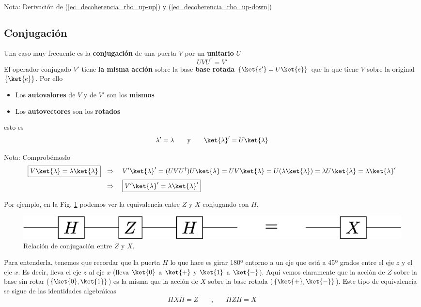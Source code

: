 \documentclass[a4paper,11pt]{book} %
\numberwithin{equation}{chapter}
\def\lch{\left\{}
\def\rch{\right\}}
\begin{document}
\begin{mybox_blue}{Nota: Derivación de (\ref{ec_decoherencia_rho_up-up}) y  (\ref{ec_decoherencia_rho_up-down})}
        \subsection{Conjugación}

Una caso muy frecuente es la \textbf{conjugación} de una puerta $V$  por un \textbf{unitario} $U$
	\begin{equation}
	U V   U^\dagger = V'  
	\end{equation}
El operador conjugado $V'$ tiene \textbf{la misma acción} sobre la base \textbf{base rotada} $\{\ket{e'} = U\ket{e}\}$ que la que tiene $V$ sobre la original $\{\ket{e}\}$. Por ello
\begin{itemize}
	\item Los \textbf{autovalores} de $V$ y de $V'$ son los \textbf{mismos}
	\item Los \textbf{autovectores} son los \textbf{rotados}
\end{itemize}
esto es
$$
\lambda' = \lambda ~~~~~~\hbox{y}~~~~~~  \ket{\lambda}' = U\ket{\lambda}
$$

	\begin{mybox_blue}{Nota: Comprobémoslo}
	\begin{align*}
	\boxed{V \ket{\lambda}= \lambda\ket{\lambda}} & ~~ \Rightarrow ~~~V'\ket{\lambda}' =
	 (UVU^\dagger) U\ket{\lambda} = UV\ket{\lambda} =  U(\lambda\ket{\lambda}) = 
	 \lambda U\ket{\lambda} = \lambda\ket{\lambda}' \\ 
	 & ~~\Rightarrow ~~~ \boxed{ V' \ket{\lambda}' 
	 = \lambda\ket{\lambda}'}
	\end{align*}
	\end{mybox_blue}

Por ejemplo, en la Fig. \ref{Fig_elementos_H_conjugation} podemos ver la equivalencía entre $Z$ y $X$ conjugando con $H$. 
	\begin{figure}[H]
	\centering 
	\includegraphics[width=0.5\linewidth]{Figuras/Fig_elementos_H_conjugation}
	\caption{Relación de conjugación entre $Z$ y $X$.}
	\label{Fig_elementos_H_conjugation}
	\end{figure}
Para entenderla, tenemos que recordar que  la puerta $H$ lo que hace es girar 180º entorno a un eje que está a 45º grados entre el eje $z$ y el eje $x$. Es decir, lleva el eje $z$ al eje $x$ (lleva $\ket{0}$ a $\ket{+}$ y $\ket{1}$ a $\ket{-}$). Aquí vemos claramente que la acción de $Z$ sobre la base sin rotar ($\lch \ket{0}, \ket{1} \rch$) es la misma que la acción de $X$ sobre la base rotada ($\lch \ket{+},\ket{-} \rch $). Este tipo de equivalencia se sigue de las identidades algebráicas
\begin{eqnarray}
HXH = Z ~~~~~&,&~~ ~~~
HZH = X \nonumber
\end{eqnarray}


\end{mybox_blue}
\end{document}
